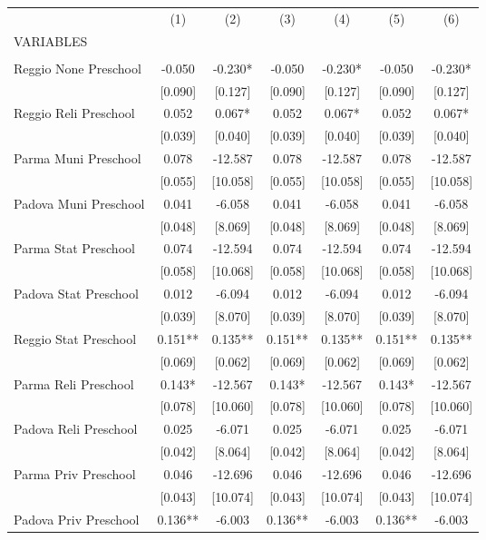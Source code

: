 \begin{tabular}{lcccccc} \hline
 & (1) & (2) & (3) & (4) & (5) & (6) \\
VARIABLES &  &  &  &  &  &  \\ \hline
 &  &  &  &  &  &  \\
Reggio None Preschool & -0.050 & -0.230* & -0.050 & -0.230* & -0.050 & -0.230* \\
 & [0.090] & [0.127] & [0.090] & [0.127] & [0.090] & [0.127] \\
Reggio Reli Preschool & 0.052 & 0.067* & 0.052 & 0.067* & 0.052 & 0.067* \\
 & [0.039] & [0.040] & [0.039] & [0.040] & [0.039] & [0.040] \\
Parma Muni Preschool & 0.078 & -12.587 & 0.078 & -12.587 & 0.078 & -12.587 \\
 & [0.055] & [10.058] & [0.055] & [10.058] & [0.055] & [10.058] \\
Padova Muni Preschool & 0.041 & -6.058 & 0.041 & -6.058 & 0.041 & -6.058 \\
 & [0.048] & [8.069] & [0.048] & [8.069] & [0.048] & [8.069] \\
Parma Stat Preschool & 0.074 & -12.594 & 0.074 & -12.594 & 0.074 & -12.594 \\
 & [0.058] & [10.068] & [0.058] & [10.068] & [0.058] & [10.068] \\
Padova Stat Preschool & 0.012 & -6.094 & 0.012 & -6.094 & 0.012 & -6.094 \\
 & [0.039] & [8.070] & [0.039] & [8.070] & [0.039] & [8.070] \\
Reggio Stat Preschool & 0.151** & 0.135** & 0.151** & 0.135** & 0.151** & 0.135** \\
 & [0.069] & [0.062] & [0.069] & [0.062] & [0.069] & [0.062] \\
Parma Reli Preschool & 0.143* & -12.567 & 0.143* & -12.567 & 0.143* & -12.567 \\
 & [0.078] & [10.060] & [0.078] & [10.060] & [0.078] & [10.060] \\
Padova Reli Preschool & 0.025 & -6.071 & 0.025 & -6.071 & 0.025 & -6.071 \\
 & [0.042] & [8.064] & [0.042] & [8.064] & [0.042] & [8.064] \\
Parma Priv Preschool & 0.046 & -12.696 & 0.046 & -12.696 & 0.046 & -12.696 \\
 & [0.043] & [10.074] & [0.043] & [10.074] & [0.043] & [10.074] \\
Padova Priv Preschool & 0.136** & -6.003 & 0.136** & -6.003 & 0.136** & -6.003 \\

\end{tabular}
